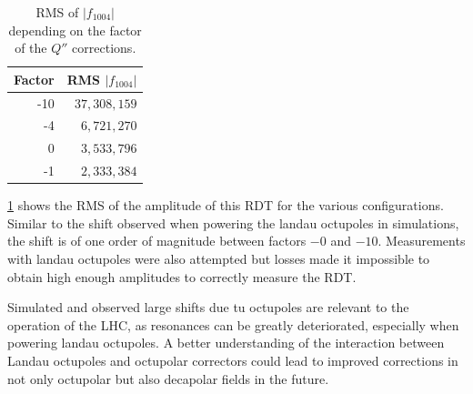 \begin{table}
    \centering
    \begin{tabular}{rr}
    \toprule
    Factor & RMS $|f_{1004}|$ \\
    \midrule
       -10 & $37,308,159$         \\ 
        -4 &  $6,721,270$          \\ 
         0 &  $3,533,796$          \\ 
        -1 &  $2,333,384$          \\
    \bottomrule
    \end{tabular}
    \caption{RMS of $|f_{1004}|$ depending on the factor of the $Q''$ corrections.}
    \label{table:decapoles:corrections_dq2_f1004_rms}
  \end{table}
  
\cref{table:decapoles:corrections_dq2_f1004_rms} shows the RMS of the amplitude of this RDT for the 
various configurations. Similar to the shift observed when powering the landau octupoles in
simulations, the shift is of one order of magnitude between factors $-0$ and $-10$. Measurements
with landau octupoles were also attempted but losses made it impossible to obtain high enough
amplitudes to correctly measure the RDT.

Simulated and observed large shifts due tu octupoles are relevant to the operation of the LHC, as
resonances can be greatly deteriorated, especially when powering landau octupoles.
A better understanding of the interaction between Landau octupoles and octupolar correctors could
lead to improved corrections in not only octupolar but also decapolar fields in the future.